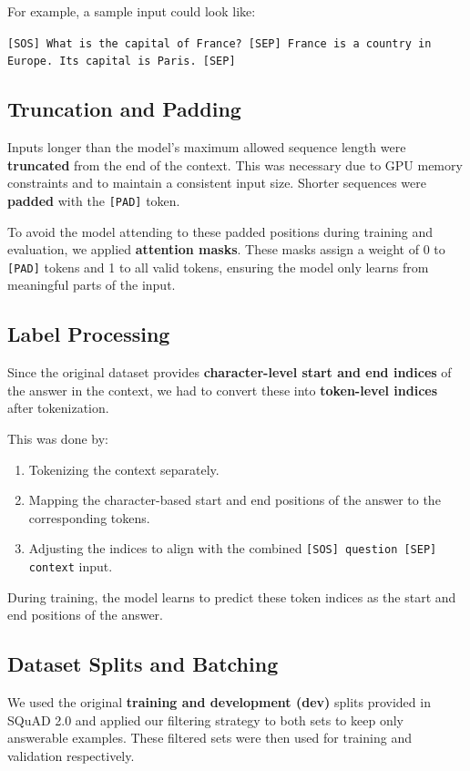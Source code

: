 \documentclass[runningheads]{llncs}
\begin{document}
For example, a sample input could look like:

\texttt{[SOS] What is the capital of France? [SEP] France is a country in Europe. Its capital is Paris. [SEP]}

\subsection{Truncation and Padding}

Inputs longer than the model’s maximum allowed sequence length were \textbf{truncated} from the end of the context. This was necessary due to GPU memory constraints and to maintain a consistent input size. Shorter sequences were \textbf{padded} with the \texttt{[PAD]} token.

To avoid the model attending to these padded positions during training and evaluation, we applied \textbf{attention masks}. These masks assign a weight of 0 to \texttt{[PAD]} tokens and 1 to all valid tokens, ensuring the model only learns from meaningful parts of the input.

\subsection{Label Processing}

Since the original dataset provides \textbf{character-level start and end indices} of the answer in the context, we had to convert these into \textbf{token-level indices} after tokenization.

This was done by:
\begin{enumerate}
    \item Tokenizing the context separately.
    \item Mapping the character-based start and end positions of the answer to the corresponding tokens.
    \item Adjusting the indices to align with the combined \texttt{[SOS] question [SEP] context} input.
\end{enumerate}

During training, the model learns to predict these token indices as the start and end positions of the answer.

\subsection{Dataset Splits and Batching}

We used the original \textbf{training and development (dev)} splits provided in SQuAD 2.0 and applied our filtering strategy to both sets to keep only answerable examples. These filtered sets were then used for training and validation respectively.
\end{document}
